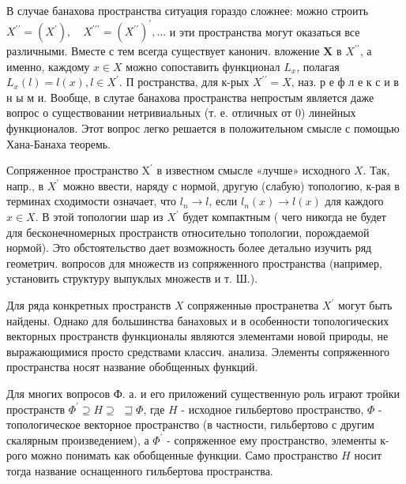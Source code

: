 \documentclass[10pt]{article}
\begin{document}
В случае банахова пространства ситуация гораздо сложнее: можно строить $X^{\prime \prime}=\left(X^{\prime}\right), \quad X^{\prime \prime \prime}=\left(X^{\prime \prime}\right)^{\prime}, \ldots$ и эти пространства могут оказаться все различными. Вместе с тем всегда существует канонич. вложение $\boldsymbol{X}$ в $X^{\prime \prime}$, а именно, каждому $x \in X$ можно сопоставить функционал $L_{x}$, полагая $L_{x}(l)=l(x), l \in X^{\prime}$. П ространства, для к-рых $X^{\prime \prime}=X$, наз. р е ф л е к с и в н ы м и. Вообще, в слутае банахова пространства непростым является даже вопрос о существовании нетривиальных (т. е. отличных от 0) линейных функционалов. Этот вопрос легко решается в положительном смысле с помощью Хана-Банаха теоремь.



Сопряженное пространство $\mathrm{X}^{\prime}$ в известном смысле «лучше» исходного $X$. Так, напр., в $X^{\prime}$ можно ввести, наряду с нормой, другую (слабую) топологию, к-рая в терминах сходимости означает, что $l_{n} \rightarrow l$, если $l_{n}(x) \longrightarrow l(x)$ для каждого $x \in X$. В этой топологии шар из $X^{\prime}$ будет компактным ( чего никогда не будет для бесконечномерных пространств относительно топологии, порождаемой нормой). Это обстоятельство дает возможность более детально изучить ряд геометрич. вопросов для множеств из сопряженного пространства (например, установить структуру выпуклых множеств и т. Ш.).



Для ряда конкретных пространств $X$ сопряженныө пространетва $X^{\prime}$ могут быть найдены. Однако для большинства банаховых и в особенности топологических векторных пространств функционалы являются элементами новой природы, не выражающимися просто средствами классич. анализа. Элементы сопряженного пространства носят название обобщенных функций.



Для многих вопросов Ф. а. и его приложений существенную роль играют тройки пространств $\Phi^{\prime} \supseteq H \supseteq$ $\sqsupseteq \Phi$, где $H$ - исходное гильбертово пространство, $\Phi$ - топологическое векторное пространство (в частности, гильбертово с другим скалярным произведением), а $\Phi^{\prime}$ - сопряженное ему пространство, элементы к-рого можно понимать как обобщенные функции. Само пространство $H$ носит тогда название оснащенного гильбертова пространства.
\end{document}
